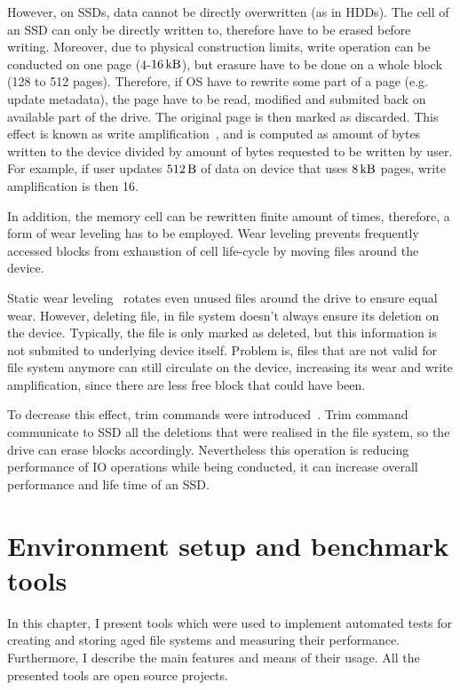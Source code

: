 \documentclass[
  color, %
  table, %
  lof,   %
  lot,   %
]{fithesis3}
\begin{document}
However, on SSDs, data cannot be directly overwritten (as in HDDs). The cell of an SSD can only be directly written to, therefore have to be erased before writing. Moreover, due to physical construction limits, write operation can be conducted on one page (4-$\SI{16}{\kilo\byte}$), but erasure have to be done on a whole block (128 to 512 pages). Therefore, if OS have to rewrite some part of a page (e.g. update metadata), the page have to be read, modified and submited back on available part of the drive. The original page is then marked as discarded. This effect is known as write amplification~\cite{Hu:2009:WAA:1534530.1534544}, and is computed as amount of bytes written to the device divided by amount of bytes requested to be written by user. For example, if user updates $\SI{512}{\byte}$ of data on device that uses $\SI{8}{\kilo\byte}$ pages, write amplification is then 16.

In addition, the memory cell can be rewritten finite amount of times, therefore, a form of wear leveling has to be employed. Wear leveling prevents frequently accessed blocks from exhaustion of cell life-cycle by moving files around the device.

Static wear leveling~\cite{Chang:2007:EEF:1278480.1278533} rotates even unused files around the drive to ensure equal wear. However, deleting file, in file system doesn't always ensure its deletion on the device. Typically, the file is only marked as deleted, but this information is not submited to underlying device itself. Problem is, files that are not valid for file system anymore can still circulate on the device, increasing its wear and write amplification, since there are less free block that could have been.

To decrease this effect, trim commands were introduced~\cite{Frankie:2012:MMT:2184512.2184527}. Trim command communicate to SSD all the deletions that were realised in the file system, so the drive can erase blocks accordingly. Nevertheless this operation is reducing performance of IO operations while being conducted, it can increase overall performance and life time of an SSD.



\chapter{Environment setup and benchmark tools}
\label{tools}
In this chapter, I present tools which were used to implement automated tests for creating and storing aged file systems and measuring their performance. Furthermore, I describe the main features and means of their usage. All the presented tools are open source projects.
\end{document}
